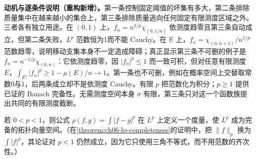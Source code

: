 \documentclass[../../main.tex]{subfiles}
\begin{document}
\begin{remark}
\textbf{动机与逐条件说明（重构新增）。}第一条控制固定阈值的坏集有多大，第二条排除质量集中在越来越小的集合上，第三条排除质量逃向任何固定有限测度区域之外。三者各有独立用途。在 $(0,1)$ 上，$f_n=n^{1/p}\chi_{(0,1/n)}$ 依测度趋零且第三条自动成立，但第二条失败，$L^p$ 范数恒为1而不能 Cauchy。在 $\mathbb R$ 上，$f_n=\chi_{(n,n+1)}/n^{1/p}$ 范数趋零，说明移动支集本身不一定造成障碍；真正显示第三条不可删的例子是 $f_n=n^{-1/p}\chi_{(0,n)}$：它依测度趋零，因 $|f_n|^p\leqslant1$ 而一致可积，但对任意有限测度 $E$，$\int_{E^c}|f_n|^p\geqslant1-\mu(E)/n\to1$。第一条也不可删，例如在概率空间上交替取常数0与1，后两条成立却不是依测度 Cauchy。有限 $p$ 把范数化为积分；$p\geqslant1$ 提供已证的 Banach 完备性。无需测度空间本身 $\sigma$ 有限，第三条只对这一个函数族提出共同的有限测度截断。
\end{remark}
\begin{exercise}\label{exercise:ch06-small-p-completeness}
若 $0<p<1$，则公式 $\rho(f,g)=\int|f-g|^p$ 在 $L^p$ 上定义一个度量，使 $L^p$ 成为完备的拓扑向量空间。（在\cref{theorem:ch06-lp-completeness}的证明中，把 $\|f\|_p$ 换为 $\int|f|^p$，其论证对 $p<1$ 仍然成立，因为它只使用三角不等式，而不用范数的齐次性。）
\end{exercise}
\end{document}
